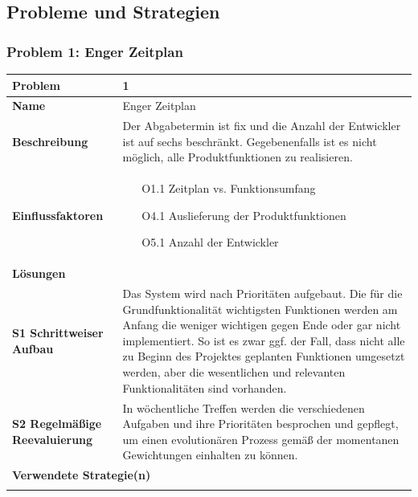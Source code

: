 \documentclass[fontsize=12pt,paper=a4,twoside]{scrartcl}
\begin{document}
\newpage
\subsection{Probleme und Strategien}
\label{sec:strategien}

\subsubsection{Problem 1: Enger Zeitplan}
\begin{tabularx}{\textwidth}{|p{6cm}|X|}
 \hline
 \textbf{Problem} & 1 \\\hline
 \textbf{Name} & Enger Zeitplan \\\hline 
 \textbf{Beschreibung} & Der Abgabetermin ist fix und die Anzahl der Entwickler ist auf sechs beschränkt. Gegebenenfalls ist es nicht möglich, alle Produktfunktionen zu realisieren.\\\hline
 \textbf{Einflussfaktoren} &
 \begin{itemize}
 \item[O1.1] Zeitplan vs. Funktionsumfang
 \item[O4.1] Auslieferung der Produktfunktionen
 \item[O5.1] Anzahl der Entwickler
 \end{itemize}\\\hline
\multicolumn{2}{|l|}{\textbf{Lösungen}} \\\hline
\textbf{S1 Schrittweiser Aufbau} & Das System wird nach Prioritäten aufgebaut. Die für die Grundfunktionalität wichtigsten Funktionen werden am Anfang die weniger wichtigen gegen Ende oder gar nicht implementiert. So ist es zwar ggf. der Fall, dass nicht alle zu Beginn des Projektes geplanten Funktionen umgesetzt werden, aber die wesentlichen und relevanten Funktionalitäten sind vorhanden. \\

\textbf{S2 Regelmäßige Reevaluierung} & In wöchentliche Treffen werden die verschiedenen Aufgaben und ihre Prioritäten besprochen und gepflegt, um einen evolutionären Prozess gemäß der momentanen Gewichtungen einhalten zu können. \\\hline
 
\multicolumn{2}{|l|}{\textbf{Verwendete Strategie(n)}} \\\hline
    & \\\hline
\end{tabularx}
\newpage
\end{document}
